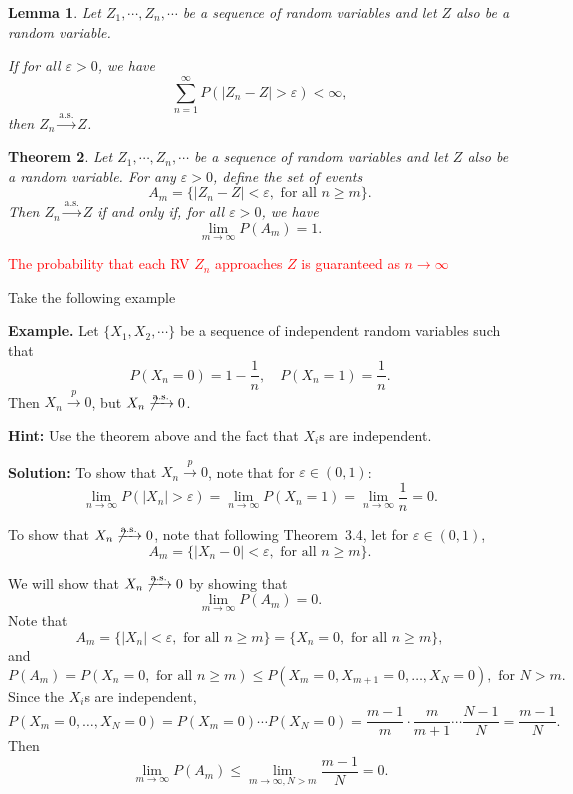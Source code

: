 \documentclass[twoside]{article}
\newcounter{lecnum}
\newtheorem{theorem}{Theorem}[lecnum]
\newtheorem{lemma}[theorem]{Lemma}
\newcommand{\note}[1]{\textcolor{red}{#1}}
\begin{document}
\begin{lemma}
Let $Z_1, \cdots, Z_n, \cdots$ be a sequence of random variables and let $Z$ also be a random variable. 

If for all $\varepsilon > 0$, we have 
\[
\sum_{n=1}^{\infty} P(|Z_n - Z| > \varepsilon) < \infty,
\]
then $Z_n \xrightarrow{\text{a.s.}} Z$.
\end{lemma}

\begin{theorem}
Let $Z_1, \cdots, Z_n, \cdots$ be a sequence of random variables and let $Z$ also be a random variable. 
For any $\varepsilon > 0$, define the set of events
\[
A_m = \{ |Z_n - Z| < \varepsilon, \text{ for all } n \ge m \}.
\]
Then $Z_n \xrightarrow{\text{a.s.}} Z$ if and only if, for all $\varepsilon > 0$, we have 
\[
\lim_{m \to \infty} P(A_m) = 1.
\]
\end{theorem}
\note{The probability that each RV $Z_n$ approaches $Z$ is guaranteed as $n\rightarrow \infty$}

Take the following example

{\bf Example.} Let $\{X_1, X_2, \cdots \}$ be a sequence of independent random variables such that 
\[
P(X_n = 0) = 1 - \frac{1}{n}, \quad P(X_n = 1) = \frac{1}{n}.
\]
Then $X_n \xrightarrow{p} 0$, but $X_n \not\xrightarrow{\text{a.s.}} 0$.

\medskip

\textbf{Hint:} Use the theorem above and the fact that $X_i$s are independent.

\medskip

\textbf{Solution:} To show that $X_n \xrightarrow{p} 0$, note that for $\varepsilon \in (0,1)$:
\[
\lim_{n \to \infty} P(|X_n| > \varepsilon) 
= \lim_{n \to \infty} P(X_n = 1) 
= \lim_{n \to \infty} \frac{1}{n} = 0.
\]

To show that $X_n \not\xrightarrow{\text{a.s.}} 0$, note that following Theorem~3.4, let for $\varepsilon \in (0,1)$,
\[
A_m = \{|X_n - 0| < \varepsilon, \text{ for all } n \ge m\}.
\]


\medskip
We will show that $X_n \not\xrightarrow{\text{a.s.}} 0$ by showing that 
\[
\lim_{m \to \infty} P(A_m) = 0.
\]
Note that
\[
A_m = \{|X_n| < \varepsilon, \text{ for all } n \ge m\}
      = \{X_n = 0, \text{ for all } n \ge m\},
\]
and
\[
P(A_m) = P(X_n = 0, \text{ for all } n \ge m)
        \le P(X_m = 0, X_{m+1} = 0, \ldots, X_N = 0), \text{ for } N > m.
\]
Since the $X_i$s are independent,
\[
P(X_m = 0, \ldots, X_N = 0) 
= P(X_m = 0) \cdots P(X_N = 0)
= \frac{m-1}{m} \cdot \frac{m}{m+1} \cdots \frac{N-1}{N} 
= \frac{m-1}{N}.
\]
Then
\[
\lim_{m \to \infty} P(A_m) 
\le \lim_{m \to \infty, N > m} \frac{m-1}{N} = 0.
\]
\end{document}
